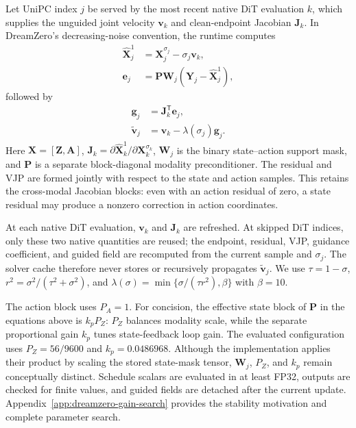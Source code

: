 Let UniPC index $j$ be served by the most recent native DiT evaluation $k$,
which supplies the unguided joint velocity $\mathbf v_k$ and clean-endpoint
Jacobian $\mathbf J_k$. In DreamZero's decreasing-noise convention, the runtime
computes
\begin{align}
    \hat{\mathbf X}_j^1
    &= \mathbf X_j^{\sigma_j}-\sigma_j\mathbf v_k, \\
    \mathbf e_j
    &= \mathbf P\mathbf W_j(\mathbf Y_j-\hat{\mathbf X}_j^1),
    \label{eq:dreamzero-current-residual}
\end{align}
followed by
\begin{align}
    \mathbf g_j &= \mathbf J_k^{\mathsf T}\mathbf e_j, \\
    \tilde{\mathbf v}_j
    &= \mathbf v_k-\lambda(\sigma_j)\mathbf g_j.
    \label{eq:dreamzero-guided-field}
\end{align}
Here $\mathbf X=[\mathbf Z,\mathbf A]$,
$\mathbf J_k=\partial\hat{\mathbf X}_k^1/
\partial\mathbf X_k^{\sigma_k}$, $\mathbf W_j$ is the binary state--action
support mask, and $\mathbf P$ is a separate block-diagonal modality
preconditioner. The residual and VJP are formed jointly with respect to the
state and action samples. This retains the cross-modal Jacobian blocks:
even with an action residual of zero, a state residual may produce a nonzero
correction in action coordinates.

At each native DiT evaluation, $\mathbf v_k$ and $\mathbf J_k$ are refreshed.
At skipped DiT indices, only these two native quantities are reused; the
endpoint, residual, VJP, guidance coefficient, and guided field are recomputed
from the current sample and $\sigma_j$. The solver cache therefore never stores
or recursively propagates $\tilde{\mathbf v}_j$. We use $\tau=1-\sigma$,
$r^2=\sigma^2/(\tau^2+\sigma^2)$, and
$\lambda(\sigma)=\min\{\sigma/(\tau r^2),\beta\}$ with $\beta=10$.

The action block uses $P_A=1$. For concision, the effective state block of
$\mathbf P$ in the equations above is $k_p P_Z$: $P_Z$ balances modality scale,
while the separate proportional gain $k_p$ tunes state-feedback loop gain. The
evaluated configuration uses $P_Z=56/9600$ and $k_p=0.0486968$. Although the
implementation applies their product by scaling the stored state-mask tensor,
$\mathbf W_j$, $P_Z$, and $k_p$ remain conceptually distinct. Schedule scalars
are evaluated in at least FP32, outputs are checked for finite values, and
guided fields are detached after the current update.
Appendix~\ref{app:dreamzero-gain-search} provides the stability motivation and
complete parameter search.

